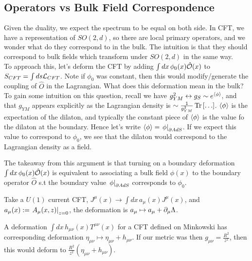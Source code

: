 \documentclass{article}
\begin{document}
\subsection{Operators vs Bulk Field Correspondence}
Given the duality, we expect the spectrum to be equal on both side. In CFT, we have a representation of $SO(2,d)$, so there are local primary operators, and we wonder what do they correspond to in the bulk. The intuition is that they should correspond to bulk fields which transform under $SO(2,d)$ in the same way. \\
To approach this, let's deform the CFT by adding $\int dx \, \phi_0(x) \hat{\mathcal{O}}(x)$ to $S_{CFT} = \int ds \mathcal{L}_{CFT}$. Note if $\phi_0$ was constant, then this would modify/generate the coupling of $\hat{O}$ in the Lagrangian. What does this deformation mean in the bulk? To gain some intuition on this question, recall we have $g_{YM}^2 \leftrightarrow g_S \sim e^{\left\langle \phi \right\rangle}$, and that $g_{YM}$ appears explicitly as the Lagrangian density is $\sim \frac{1}{g_{YM}^2} \tr\psquare{\dots}$. $\left\langle \phi \right\rangle$ is the expectation of the dilaton, and typically the constant piece of $\left\langle \phi \right\rangle$ is the value fo the dilaton at the boundary. Hence let's write $\left\langle \phi \right\rangle = \left. \phi \right\rvert_{\partial AdS}$. If we expect this value to correspond to $\phi_0$, we see that the dilaton would correspond to the Lagrangian density as a field. 
\begin{remark}
	The takeaway from this argument is that turning on a boundary deformation $\int dx \, \phi_0(x) \hat{\mathcal{O}}(x)$ is equivalent to associating a bulk field $\phi(x)$ to the boundary operator $\hat{O}$ s.t the boundary value $\left. \phi \right\rvert_{\partial AdS}$ corresponds to $\phi_0$. 
\end{remark}
\begin{example}
	Take a $U(1)$ current CFT, $J^\mu(x) \to \int dx \, a_\mu (x) J^\mu(x)$, and  $a_\mu(x) := \left. A_\mu(x,z) \right\rvert_{z=0}$, the deformation is $a_\mu \mapsto a_\mu + \partial_\mu \Lambda$. 
\end{example}

\begin{example}
	A deformation $\int dx \, h_{\mu\nu}(x) T^{\mu\nu}(x)$ for a CFT defined on Minkowski has corresponding deformation $\eta_{\mu\nu} \mapsto \eta_{\mu\nu} + h_{\mu\nu}$. If our metric was then $g_{\mu\nu} = \frac{R^2}{z^2}$, then this would deform to $\frac{R^2}{z^2}(\eta_{\mu\nu}+h_{\mu\nu})$.  
\end{example}


\end{document}
